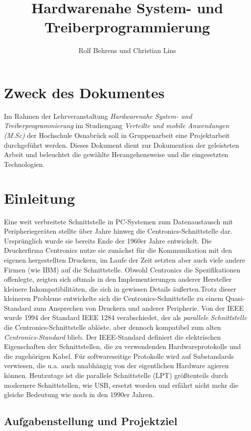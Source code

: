 \documentclass[a4paper,11pt]{article}
\title{Hardwarenahe System- und Treiberprogrammierung}
\author{\parbox{7cm}{Rolf Behrens und Christian Lins}}
\begin{document}
\sloppy

\maketitle
\tableofcontents
\section{Zweck des Dokumentes}
Im Rahmen der Lehrveranstaltung \textit{Hardwarenahe System- und Treiberprogrammierung} im Studiengang \textit{Verteilte und mobile Anwendungen (M.Sc)} der Hochschule Osnabrück soll in Gruppenarbeit eine Projektarbeit durchgeführt werden. Dieses Dokument dient zur Dokumention der geleisteten Arbeit und beleuchtet die gewählte Herangehensweise und die eingesetzten Technologien.

\section{Einleitung}

Eine weit verbreitete Schnittstelle in PC-Systemen zum Datenaustausch mit Peripheriegeräten stellte über Jahre hinweg die Centronics-Schnittstelle dar. Ursprünglich wurde sie bereits Ende der 1960er Jahre entwickelt. Die Druckerfirma Centronics nutze sie zunächst für die Kommunikation mit den eigenen hergestellten Druckern, im Laufe der Zeit setzten aber auch viele andere Firmen (wie IBM) auf die Schnittstelle. Obwohl Centronics die Spezifikationen offenlegte, zeigten sich oftmals in den Implementierungen anderer Hersteller kleinere Inkompatibilitäten, die sich in gewissen Details äußerten.Trotz dieser kleineren Probleme entwickelte sich die Centronics-Schnittstelle zu einem Quasi-Standard zum Ansprechen von Druckern und anderer Peripherie. Von der IEEE wurde 1994 der Standard IEEE 1284 verabschiedet, der als \textit{parallele Schnittstelle} die Centronics-Schnittstelle ablöste, aber dennoch kompatibel zum alten \textit{Centronics-Standard} blieb. Der IEEE-Standard definiert die elektrischen Eigenschaften der Schnittstellen, die zu verwendenden Hardwareprotokolle und die zugehörigen Kabel. Für softwareseitige Protokolle wird auf Substandards verwiesen, die u.a. auch unabhängig von der eigentlichen Hardware agieren können. Heutzutage ist die parallele Schnittstelle (LPT) größtenteils durch modernere Schnittstellen, wie USB, ersetzt worden und erfährt nicht mehr die gleiche Bedeutung wie noch in den 1990er Jahren. 

 
\subsection{Aufgabenstellung und Projektziel}
\end{document}
